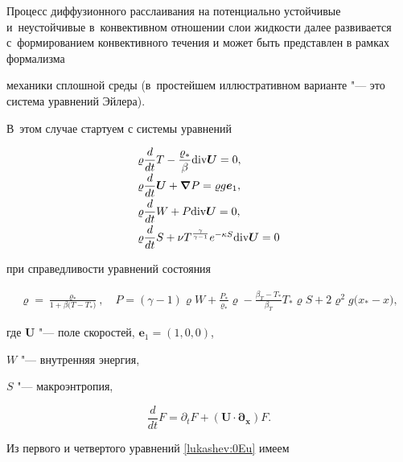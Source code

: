 Процесс диффузионного расслаивания на потенциально устойчивые и~неустойчивые в~конвективном отношении слои жидкости далее развивается с~формированием конвективного течения и может быть представлен в рамках формализма

механики сплошной среды (в~простейшем иллюстративном варианте "--- это система уравнений Эйлера). 

В~этом случае стартуем с системы уравнений

\begin{equation}

\label{lukashev:0Eu}

\begin{array}{l}

\varrho\dfrac{d}{dt} T-\dfrac{\varrho_*}{\beta}{\mathop{\rm div}\nolimits} \boldsymbol U=0,\\[2mm]

\varrho\dfrac{d}{dt} \boldsymbol U+ \boldsymbol \nabla P=\varrho g \boldsymbol e_1,\\[2mm]

\varrho\dfrac{d}{dt} W+P {\mathop{\rm div}\nolimits} \boldsymbol  U=0,\\[2mm]

\varrho\dfrac{d}{dt} S+\nu T^{\frac\gamma{\gamma-1}} e^{-\kappa S} {\mathop{\rm div}\nolimits} \boldsymbol U=0

\end{array}

\end{equation}

при справедливости уравнений состояния

\begin{gather}

\varrho=\frac{\varrho_*}{1+\beta\big(T-T_*

\big)},\quad P=(\gamma-1)\varrho W+\frac{P_*}{\varrho_*}\varrho-

\frac{\beta_T-T_*}{\beta_T} T_*\varrho S +2\varrho^2 g\big(x_*-x\big), \label{lukashev:EqState}

\end{gather}

где  $\boldsymbol U$ "--- поле скоростей, $\boldsymbol e_1=(1,0,0)$, 

$W$ "--- внутренняя энергия, 

$S$ "--- макроэнтропия, 

$$\frac{d}{dt} F={\partial}_t F+(\boldsymbol U\cdot \boldsymbol{{\partial}_x}) F.$$ 

Из первого и четвертого уравнений \eqref{lukashev:0Eu} имеем

